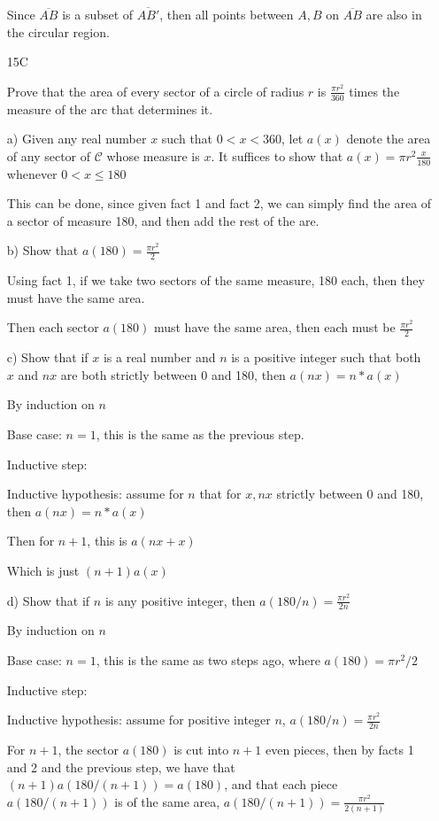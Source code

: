 \documentclass[11pt]{article}
\newcommand{\segment}[1]{\overline{#1}}
\begin{document}
\begin{itemize}
		Since $\segment{AB}$ is a subset of $\segment{AB'}$, then all points between $A,B$ on $\segment{AB}$ are also in the circular region.

	\item[15C]
	
		Prove that the area of every sector of a circle of radius $r$ is $\frac{\pi r^2}{360}$ times the measure of the arc that determines it.

		a) Given any real number $x$ such that $0 < x < 360$, let $a(x)$ denote the area of any sector of $\mathscr{C}$ whose measure is $x$. It suffices to show that $a(x) = \pi r^2 \frac{x}{180}$ whenever $ 0 < x \leq 180$

		This can be done, since given fact 1 and fact 2, we can simply find the area of a sector of measure 180, and then add the rest of the are.

		b) Show that $a(180) = \frac{\pi r^2}{2}$

		Using fact 1, if we take two sectors of the same measure, 180 each, then they must have the same area. 
		
		Then each sector $a(180)$ must have the same area, then each must be $\frac{\pi r^2}{2}$

		c) Show that if $x$ is a real number and $n$ is a positive integer such that both $x$ and $nx$ are both strictly between 0 and 180, then $a(nx) = n * a(x)$

		By induction on $n$

		Base case: $n = 1$, this is the same as the previous step.

		Inductive step: 
		
		Inductive hypothesis: assume for $n$ that for $x, nx$ strictly between 0 and 180, then $a(nx) = n * a(x)$

		Then for $n + 1$, this is $a(nx + x)$

		Which is just $(n+1)a(x)$
		
		d) Show that if $n$ is any positive integer, then $a(180/n) = \frac{\pi r^2}{2n}$

		By induction on $n$

		Base case: $n = 1$, this is the same as two steps ago, where $a(180) = \pi r^2 / 2$

		Inductive step:

		Inductive hypothesis: assume for positive integer $n$, $a(180/n) = \frac{\pi r^2}{2n}$

		For $n+1$, the sector $a(180)$ is cut into $n + 1$ even pieces, then by facts 1 and 2 and the previous step, we have that $(n+1)a(180/(n+1)) = a(180)$, and that each piece $a(180/(n+1))$ is of the same area, $a(180/(n+1)) = \frac{\pi r^2}{2(n+1)}$


\end{itemize}
\end{document}
